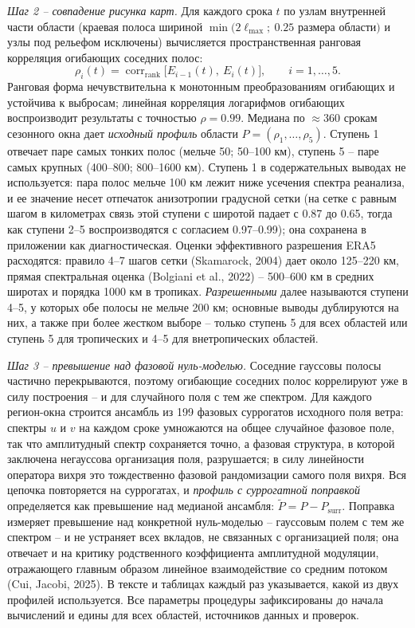 \documentclass[12pt,a4paper]{article}
\newcommand{\Psurr}{P_{\mathrm{surr}}}
\begin{document}
\emph{Шаг 2 -- совпадение рисунка карт.} Для каждого срока $t$ по узлам внутренней части области (краевая полоса шириной $\min(2\ell_{\max};\ 0.25$ размера области$)$ и узлы под рельефом исключены) вычисляется пространственная ранговая корреляция огибающих соседних полос:
\begin{equation}
\label{eq:rho}
\rho_i(t) = \operatorname{corr}_{\mathrm{rank}}\bigl[E_{i-1}(t),\ E_i(t)\bigr], \qquad i = 1, \dots, 5.
\end{equation}
Ранговая форма нечувствительна к монотонным преобразованиям огибающих и устойчива к выбросам; линейная корреляция логарифмов огибающих воспроизводит результаты с точностью $\rho = 0.99$. Медиана по $\approx$360 срокам сезонного окна дает \emph{исходный профиль} области $P = (\rho_1, \dots, \rho_5)$. Ступень 1 отвечает паре самых тонких полос (мельче 50; 50--100 км), ступень 5 -- паре самых крупных (400--800; 800--1600 км). Ступень 1 в содержательных выводах не используется: пара полос мельче 100 км лежит ниже усечения спектра реанализа, и ее значение несет отпечаток анизотропии градусной сетки (на сетке с равным шагом в километрах связь этой ступени с широтой падает с 0.87 до 0.65, тогда как ступени 2--5 воспроизводятся с согласием 0.97--0.99); она сохранена в приложении как диагностическая. Оценки эффективного разрешения ERA5 расходятся: правило 4--7 шагов сетки (Skamarock, 2004) дает около 125--220 км, прямая спектральная оценка (Bolgiani et al., 2022) -- 500--600 км в средних широтах и порядка 1000 км в тропиках. \emph{Разрешенными} далее называются ступени 4--5, у которых обе полосы не мельче 200 км; основные выводы дублируются на них, а также при более жестком выборе -- только ступень 5 для всех областей или ступень 5 для тропических и 4--5 для внетропических областей.

\emph{Шаг 3 -- превышение над фазовой нуль-моделью.} Соседние гауссовы полосы частично перекрываются, поэтому огибающие соседних полос коррелируют уже в силу построения -- и для случайного поля с тем же спектром. Для каждого регион-окна строится ансамбль из 199 фазовых суррогатов исходного поля ветра: спектры $u$ и $v$ на каждом сроке умножаются на общее случайное фазовое поле, так что амплитудный спектр сохраняется точно, а фазовая структура, в которой заключена негауссова организация поля, разрушается; в силу линейности оператора вихря это тождественно фазовой рандомизации самого поля вихря. Вся цепочка повторяется на суррогатах, и \emph{профиль с суррогатной поправкой} определяется как превышение над медианой ансамбля: $\tilde P = P - \Psurr$. Поправка измеряет превышение над конкретной нуль-моделью -- гауссовым полем с тем же спектром -- и не устраняет всех вкладов, не связанных с организацией поля; она отвечает и на критику родственного коэффициента амплитудной модуляции, отражающего главным образом линейное взаимодействие со средним потоком (Cui, Jacobi, 2025). В тексте и таблицах каждый раз указывается, какой из двух профилей используется. Все параметры процедуры зафиксированы до начала вычислений и едины для всех областей, источников данных и проверок.
\end{document}
